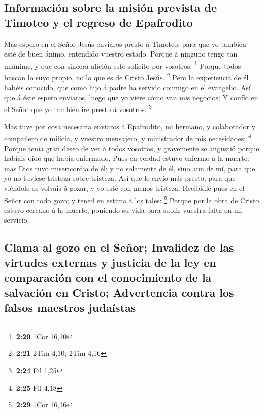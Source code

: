 \hypertarget{informaciuxf3n-sobre-la-misiuxf3n-prevista-de-timoteo-y-el-regreso-de-epafrodito}{%
\subsection{Información sobre la misión prevista de Timoteo y el regreso
de
Epafrodito}\label{informaciuxf3n-sobre-la-misiuxf3n-prevista-de-timoteo-y-el-regreso-de-epafrodito}}

 Mas espero en el Señor Jesús enviaros presto á Timoteo,
para que yo también esté de buen ánimo, entendido vuestro estado.
 Porque á ninguno tengo tan unánime, y que con sincera
afición esté solícito por vosotros. \footnote{\textbf{2:20} 1Cor 16,10}
 Porque todos buscan lo suyo propio, no lo que es de
Cristo Jesús. \footnote{\textbf{2:21} 2Tim 4,10; 2Tim 4,16}
 Pero la experiencia de él habéis conocido, que como hijo
á padre ha servido conmigo en el evangelio.  Así que á
éste espero enviaros, luego que yo viere cómo van mis negocios;
 Y confío en el Señor que yo también iré presto á
vosotros. \footnote{\textbf{2:24} Fil 1,25}

 Mas tuve por cosa necesaria enviaros á Epafrodito, mi
hermano, y colaborador y compañero de milicia, y vuestro mensajero, y
ministrador de mis necesidades; \footnote{\textbf{2:25} Fil 4,18}
 Porque tenía gran deseo de ver á todos vosotros, y
gravemente se angustió porque habíais oído que había enfermado.
 Pues en verdad estuvo enfermo á la muerte: mas Dios tuvo
misericordia de él; y no solamente de él, sino aun de mí, para que yo no
tuviese tristeza sobre tristeza.  Así que le envío más
presto, para que viéndole os volváis á gozar, y yo esté con menos
tristeza.  Recibidle pues en el Señor con todo gozo; y
tened en estima á los tales: \footnote{\textbf{2:29} 1Cor 16,16}
 Porque por la obra de Cristo estuvo cercano á la muerte,
poniendo su vida para suplir vuestra falta en mi servicio.

\hypertarget{clama-al-gozo-en-el-seuxf1or-invalidez-de-las-virtudes-externas-y-justicia-de-la-ley-en-comparaciuxf3n-con-el-conocimiento-de-la-salvaciuxf3n-en-cristo-advertencia-contra-los-falsos-maestros-judauxedstas}{%
\subsection{Clama al gozo en el Señor; Invalidez de las virtudes
externas y justicia de la ley en comparación con el conocimiento de la
salvación en Cristo; Advertencia contra los falsos maestros
judaístas}\label{clama-al-gozo-en-el-seuxf1or-invalidez-de-las-virtudes-externas-y-justicia-de-la-ley-en-comparaciuxf3n-con-el-conocimiento-de-la-salvaciuxf3n-en-cristo-advertencia-contra-los-falsos-maestros-judauxedstas}}

